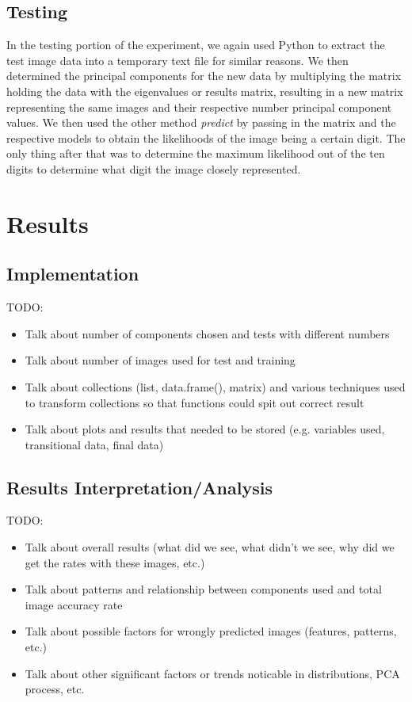 \documentclass[twocolumn]{article}
\begin{document}
\subsection{Testing} %
\label{subsec:testing}
In the testing portion of the experiment, we again used Python to extract the test image data into a temporary text file for similar reasons. We then determined the principal components for the new data by multiplying the matrix holding the data with the eigenvalues or results matrix, resulting in a new matrix representing the same images and their respective number principal component values. We then used the other method \emph{predict} by passing in the matrix and the respective models to obtain the likelihoods of the image being a certain digit. The only thing after that was to determine the maximum likelihood out of the ten digits to determine what digit the image closely represented.

\section{Results} %
\label{sec:results}

\subsection{Implementation}
\label{subsec:narrative}

TODO:
\begin{itemize}
    \item Talk about number of components chosen and tests with different numbers
    \item Talk about number of images used for test and training
    \item Talk about collections (list, data.frame(), matrix) and various techniques used to transform collections so that functions could spit out correct result
    \item Talk about plots and results that needed to be stored (e.g. variables used, transitional data, final data)
\end{itemize}


\subsection{Results Interpretation/Analysis}
\label{subsec:interpretation}

TODO:
\begin{itemize}
    \item Talk about overall results (what did we see, what didn't we see, why did we get the rates with these images, etc.)
    \item Talk about patterns and relationship between components used and total image accuracy rate
    \item Talk about possible factors for wrongly predicted images (features, patterns, etc.)
    \item Talk about other significant factors or trends noticable in distributions, PCA process, etc.
\end{itemize}
\end{document}
